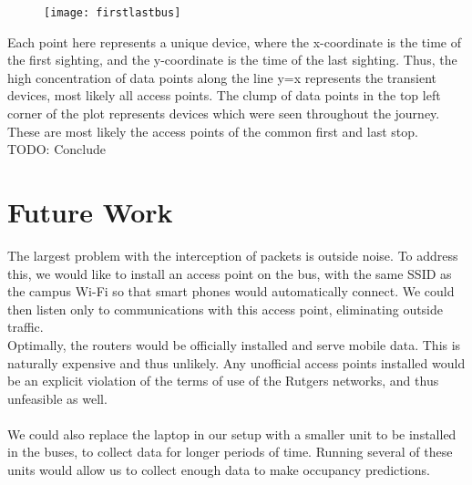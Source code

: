 \documentclass[letterpaper,abstract=on,titlepage=false]{scrreprt}
\begin{document}
	\begin{figure}[H]
	\texttt{[image: firstlastbus]}
	\centering
	\end{figure}

	Each point here represents a unique device, where the x-coordinate is the time of the first sighting, and the y-coordinate is the time of the last sighting.
	Thus, the high concentration of data points along the line y=x represents the transient devices, most likely all access points.
	The clump of data points in the top left corner of the plot represents devices which were seen throughout the journey. 
	These are most likely the access points of the common first and last stop.
	\\

	TODO: Conclude


\section*{Future Work}
The largest problem with the interception of packets is outside noise.
To address this, we would like to install an access point on the bus, with the same SSID as the campus Wi-Fi so that smart phones would automatically connect.
We could then listen only to communications with this access point, eliminating outside traffic.
\\
Optimally, the routers would be officially installed and serve mobile data. 
This is naturally expensive and thus unlikely. 
Any unofficial access points installed would be an explicit violation of the terms of use of the Rutgers networks, and thus unfeasible as well.
\\
\\
We could also replace the laptop in our setup with a smaller unit to be installed in the buses, to collect data for longer periods of time. 
Running several of these units would allow us to collect enough data to make occupancy predictions.
\end{document}
